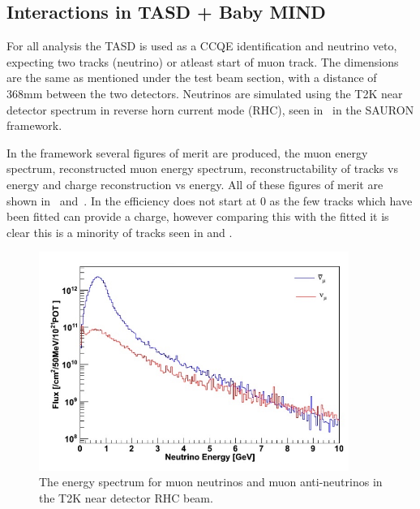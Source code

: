 

\subsection{Interactions in TASD + Baby MIND}

For all analysis the TASD is used as a CCQE identification and neutrino veto, expecting two tracks (neutrino) or atleast start of muon track. The dimensions are the same as mentioned under the test beam section, with a distance of 368mm between the two detectors. Neutrinos are simulated using the T2K near detector spectrum in reverse horn current mode (RHC), seen in~ in the SAURON framework. 

In the framework several figures of merit are produced, the muon energy spectrum, reconstructed muon energy spectrum, reconstructability of tracks vs energy and charge reconstruction vs energy. All of these figures of merit are shown in~ and~. In  the efficiency does not start at 0 as the few tracks which have been fitted can provide a charge, however comparing this with the fitted it is clear this is a minority of tracks seen in  and .

\begin{figure}[h!]
\centering
\includegraphics[width=0.9\textwidth]{figures/WAGASCIflux.jpeg}
\caption{The energy spectrum for muon neutrinos and muon anti-neutrinos in the T2K near detector RHC beam.}
\label{fig:T2KndSpectrum}
\end{figure}

